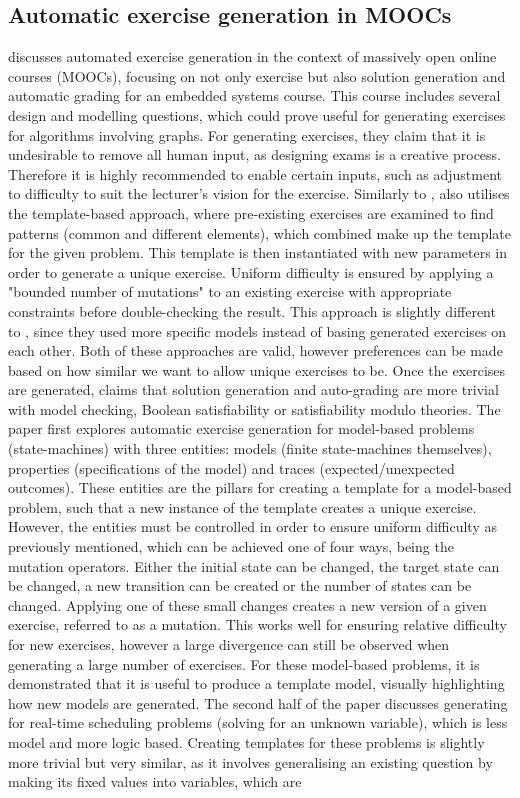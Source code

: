 \documentclass{l4proj}
\begin{document}
\subsection{Automatic exercise generation in MOOCs}
\citet{Sad12} discusses automated exercise generation in the context of massively open online courses (MOOCs), focusing on not only exercise but also solution generation and automatic grading for an embedded systems course. This course includes several design and modelling questions, which could prove useful for generating exercises for algorithms involving graphs. For generating exercises, they claim that it is undesirable to remove all human input, as designing exams is a creative process. Therefore it is highly recommended to enable certain inputs, such as adjustment to difficulty to suit the lecturer's vision for the exercise. Similarly to \citet{Hoz21}, \citet{Sad12} also utilises the template-based approach, where pre-existing exercises are examined to find patterns (common and different elements), which combined make up the template for the given problem. This template is then instantiated with new parameters in order to generate a unique exercise. Uniform difficulty is ensured by applying a "bounded number of mutations" to an existing exercise with appropriate constraints before double-checking the result. This approach is slightly different to \citet{Hoz21}, since they used more specific models instead of basing generated exercises on each other. Both of these approaches are valid, however preferences can be made based on how similar we want to allow unique exercises to be. Once the exercises are generated, \citet{Sad12} claims that solution generation and auto-grading are more trivial with model checking, Boolean satisfiability or satisfiability modulo theories. The paper first explores automatic exercise generation for model-based problems (state-machines) with three entities: models (finite state-machines themselves), properties (specifications of the model) and traces (expected/unexpected outcomes). These entities are the pillars for creating a template for a model-based problem, such that a new instance of the template creates a unique exercise. However, the entities must be controlled in order to ensure uniform difficulty as previously mentioned, which can be achieved one of four ways, being the mutation operators. Either the initial state can be changed, the target state can be changed, a new transition can be created or the number of states can be changed. Applying one of these small changes creates a new version of a given exercise, referred to as a mutation. This works well for ensuring relative difficulty for new exercises, however a large divergence can still be observed when generating a large number of exercises. For these model-based problems, it is demonstrated that it is useful to produce a template model, visually highlighting how new models are generated. The second half of the paper discusses generating for real-time scheduling problems (solving for an unknown variable), which is less model and more logic based. Creating templates for these problems is slightly more trivial but very similar, as it involves generalising an existing question by making its fixed values into variables, which are 
\end{document}
